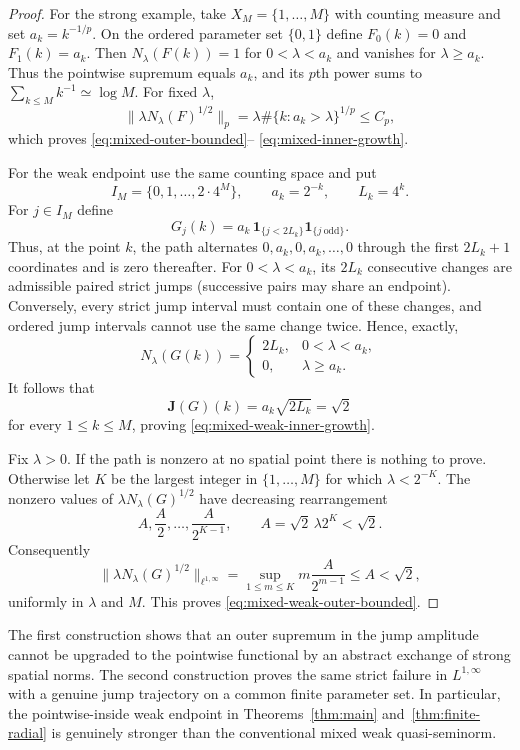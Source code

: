 \documentclass[11pt]{article}
\numberwithin{equation}{section}
\theoremstyle{remark}
\theoremstyle{definition}
\begin{document}
\begin{proof}
For the strong example, take $X_M=\{1,\ldots,M\}$ with counting measure
and set $a_k=k^{-1/p}$.
On the ordered parameter set $\{0,1\}$ define $F_0(k)=0$ and $F_1(k)=a_k$.
Then $N_\lambda(F(k))=1$ for $0<\lambda<a_k$ and vanishes for
$\lambda\ge a_k$.  Thus the pointwise supremum equals $a_k$, and its
$p$th power sums to $\sum_{k\le M}k^{-1}\simeq\log M$.  For fixed
$\lambda$,
\[
 \|\lambda N_\lambda(F)^{1/2}\|_p
 =\lambda\#\{k:a_k>\lambda\}^{1/p}\le C_p,
\]
which proves \eqref{eq:mixed-outer-bounded}--
\eqref{eq:mixed-inner-growth}.

For the weak endpoint use the same counting space and put
\[
 I_M=\{0,1,\ldots,2\cdot4^M\},\qquad
 a_k=2^{-k},\qquad L_k=4^k.
\]
For $j\in I_M$ define
\[
 G_j(k)=a_k\,\mathbf1_{\{j<2L_k\}}\mathbf1_{\{j\ \mathrm{odd}\}}.
\]
Thus, at the point $k$, the path alternates
$0,a_k,0,a_k,\ldots,0$ through the first $2L_k+1$ coordinates and is
zero thereafter.  For $0<\lambda<a_k$, its $2L_k$ consecutive changes
are admissible paired strict jumps (successive pairs may share an
endpoint).  Conversely, every strict jump interval must contain one of
these changes, and ordered jump intervals cannot use the same change
twice.  Hence, exactly,
\[
 N_\lambda(G(k))=
 \begin{cases}
  2L_k,&0<\lambda<a_k,\\
  0,&\lambda\ge a_k.
 \end{cases}
\]
It follows that
\[
 \mathbf J(G)(k)=a_k\sqrt{2L_k}=\sqrt2
\]
for every $1\le k\le M$, proving
\eqref{eq:mixed-weak-inner-growth}.

Fix $\lambda>0$.  If the path is nonzero at no spatial point there is
nothing to prove.  Otherwise let $K$ be the largest integer in
$\{1,\ldots,M\}$ for which $\lambda<2^{-K}$.  The nonzero values of
$\lambda N_\lambda(G)^{1/2}$ have decreasing rearrangement
\[
 A,\frac A2,\ldots,\frac{A}{2^{K-1}},
 \qquad A=\sqrt2\,\lambda2^K<\sqrt2.
\]
Consequently
\[
 \|\lambda N_\lambda(G)^{1/2}\|_{\ell^{1,\infty}}
 =\sup_{1\le m\le K}m\frac{A}{2^{m-1}}
 \le A<\sqrt2,
\]
uniformly in $\lambda$ and $M$.  This proves
\eqref{eq:mixed-weak-outer-bounded}.
\end{proof}

The first construction shows that an outer supremum in the jump amplitude
cannot be upgraded to the pointwise functional by an abstract exchange of
strong spatial norms.  The second construction proves the same strict
failure in $L^{1,\infty}$ with a genuine jump trajectory on a common finite
parameter set.  In particular, the pointwise-inside weak endpoint in
Theorems~\ref{thm:main} and~\ref{thm:finite-radial} is genuinely stronger
than the conventional mixed weak quasi-seminorm.
\end{document}
